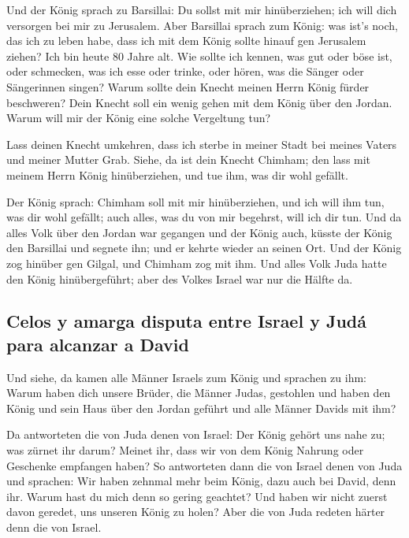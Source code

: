  Und der König sprach zu Barsillai: Du sollst mit mir
hinüberziehen; ich will dich versorgen bei mir zu Jerusalem.
 Aber Barsillai sprach zum König: was ist's noch, das ich
zu leben habe, dass ich mit dem König sollte hinauf gen Jerusalem
ziehen?  Ich bin heute 80 Jahre alt. Wie sollte ich
kennen, was gut oder böse ist, oder schmecken, was ich esse oder trinke,
oder hören, was die Sänger oder Sängerinnen singen? Warum sollte dein
Knecht meinen Herrn König fürder beschweren?  Dein Knecht
soll ein wenig gehen mit dem König über den Jordan. Warum will mir der
König eine solche Vergeltung tun?

 Lass deinen Knecht umkehren, dass ich sterbe in meiner
Stadt bei meines Vaters und meiner Mutter Grab. Siehe, da ist dein
Knecht Chimham; den lass mit meinem Herrn König hinüberziehen, und tue
ihm, was dir wohl gefällt.

 Der König sprach: Chimham soll mit mir hinüberziehen,
und ich will ihm tun, was dir wohl gefällt; auch alles, was du von mir
begehrst, will ich dir tun.  Und da alles Volk über den
Jordan war gegangen und der König auch, küsste der König den Barsillai
und segnete ihn; und er kehrte wieder an seinen Ort.  Und
der König zog hinüber gen Gilgal, und Chimham zog mit ihm. Und alles
Volk Juda hatte den König hinübergeführt; aber des Volkes Israel war nur
die Hälfte da.

\hypertarget{celos-y-amarga-disputa-entre-israel-y-juduxe1-para-alcanzar-a-david}{%
\subsection{Celos y amarga disputa entre Israel y Judá para alcanzar a
David}\label{celos-y-amarga-disputa-entre-israel-y-juduxe1-para-alcanzar-a-david}}

 Und siehe, da kamen alle Männer Israels zum König und
sprachen zu ihm: Warum haben dich unsere Brüder, die Männer Judas,
gestohlen und haben den König und sein Haus über den Jordan geführt und
alle Männer Davids mit ihm?

 Da antworteten die von Juda denen von Israel: Der König
gehört uns nahe zu; was zürnet ihr darum? Meinet ihr, dass wir von dem
König Nahrung oder Geschenke empfangen haben?  So
antworteten dann die von Israel denen von Juda und sprachen: Wir haben
zehnmal mehr beim König, dazu auch bei David, denn ihr. Warum hast du
mich denn so gering geachtet? Und haben wir nicht zuerst davon geredet,
uns unseren König zu holen? Aber die von Juda redeten härter denn die
von Israel.


